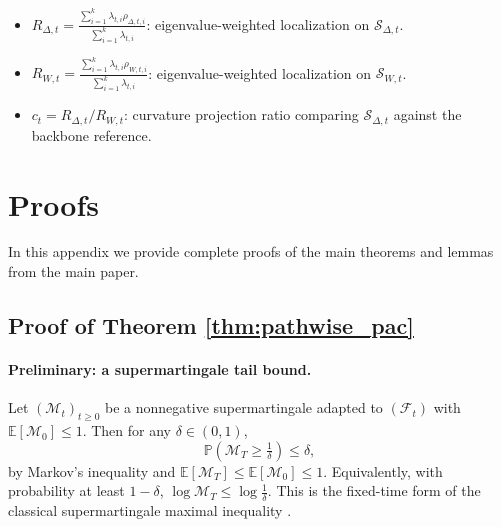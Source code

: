 \documentclass{article}
\theoremstyle{plain}
\theoremstyle{definition}
\theoremstyle{remark}
\begin{document}
\begin{itemize}
\item $R_{\Delta,t}=\frac{\sum_{i=1}^k\lambda_{t,i}\rho_{\Delta,t,i}}{\sum_{i=1}^k\lambda_{t,i}}$: eigenvalue-weighted localization on $\mathcal S_{\Delta,t}$.
\item $R_{W,t}=\frac{\sum_{i=1}^k\lambda_{t,i}\rho_{W,t,i}}{\sum_{i=1}^k\lambda_{t,i}}$: eigenvalue-weighted localization on $\mathcal S_{W,t}$.
\item $c_t=R_{\Delta,t}/R_{W,t}$: curvature projection ratio comparing $\mathcal S_{\Delta,t}$ against the backbone reference. 
\end{itemize}


\section{Proofs}
In this appendix we provide complete proofs of the main theorems and lemmas from the main paper.

\subsection{Proof of Theorem \ref{thm:pathwise_pac}}
\label{proof:theorem all}

\paragraph{Preliminary: a supermartingale tail bound.}
Let $(\mathcal M_t)_{t\ge0}$ be a nonnegative supermartingale adapted to $(\mathcal F_t)$ with $\mathbb E[\mathcal M_0]\le 1$.
Then for any $\delta\in(0,1)$,
\[
\mathbb P\!\left(\mathcal M_T \ge \tfrac{1}{\delta}\right)
\le \delta,
\]
by Markov's inequality and $\mathbb E[\mathcal M_T]\le \mathbb E[\mathcal M_0]\le 1$.
Equivalently, with probability at least $1-\delta$, $\log \mathcal M_T \le \log \tfrac{1}{\delta}$.
This is the fixed-time form of the classical supermartingale maximal inequality  \citet{yangshuxue}.
\end{document}
